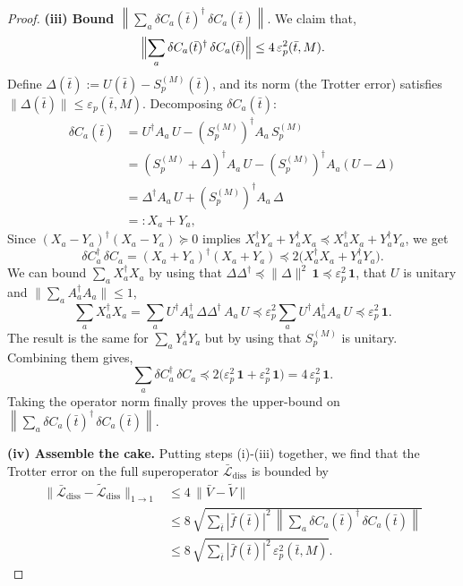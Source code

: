 \begin{proof}
    \medskip
    \noindent\textbf{(iii) Bound $\left\|\sum_a \delta C_a(\bar{t})^\dagger\, \delta C_a(\bar{t})\right\|$}. We claim that,
    $$
    \Bigl\|\sum_a \delta C_a(\bar{t})^\dagger\, \delta C_a(\bar{t})\Bigr\| \leq 4\,\varepsilon_p^2(\bar{t}, M).
    $$
    Define $\Delta(\bar{t}) := U(\bar{t}) - S_p^{(M)}(\bar{t})$, and its norm (the Trotter error) satisfies $\|\Delta(\bar{t})\| \leq \varepsilon_p(\bar{t}, M)$. Decomposing $\delta C_a(\bar{t})$:
    $$
    \begin{aligned}
        \delta C_a(\bar{t}) &= U^\dagger A_a\, U - (S_p^{(M)})^\dagger A_a\, S_p^{(M)} \\
    &= (S_p^{(M)} + \Delta)^\dagger A_a\, U - (S_p^{(M)})^\dagger A_a (U - \Delta) \\
    &= \Delta^\dagger A_a\, U + (S_p^{(M)})^\dagger A_a\, \Delta \\
    &=: X_a + Y_a,
    \end{aligned}
    $$
    Since $(X_a - Y_a)^\dagger(X_a - Y_a) \succeq 0$ implies $X_a^\dagger Y_a + Y_a^\dagger X_a \preceq X_a^\dagger X_a + Y_a^\dagger Y_a$, we get
    $$
    \delta C_a^\dagger\, \delta C_a = (X_a + Y_a)^\dagger(X_a + Y_a) \preceq 2\bigl(X_a^\dagger X_a + Y_a^\dagger Y_a\bigr).
    $$
    We can bound $\sum_a X_a^\dagger X_a$ by using that $\Delta\Delta^\dagger \preceq \|\Delta\|^2\, \mathbf{1} \preceq \varepsilon_p^2\, \mathbf{1}$, that $U$ is unitary and $\|\sum_a A_a^\dagger A_a\| \leq 1$,
    $$
    \sum_a X_a^\dagger X_a = \sum_a U^\dagger A_a^\dagger\, \Delta\Delta^\dagger\, A_a\, U
    \preceq \varepsilon_p^2 \sum_a U^\dagger A_a^\dagger A_a\, U
    \preceq \varepsilon_p^2\, \mathbf{1}.
    $$
    The result is the same for $\sum_a Y_a^\dagger Y_a$ but by using that $S_p^{(M)}$ is unitary.
    Combining them gives, 
    $$
    \sum_a \delta C_a^\dagger\, \delta C_a \preceq 2\bigl(\varepsilon_p^2\, \mathbf{1} + \varepsilon_p^2\, \mathbf{1}\bigr) = 4\,\varepsilon_p^2\, \mathbf{1}.
    $$
    Taking the operator norm finally proves the upper-bound on $\left\|\sum_a \delta C_a(\bar{t})^\dagger\, \delta C_a(\bar{t})\right\|$.

    \medskip
    \noindent\textbf{(iv) Assemble the cake.} Putting steps (i)-(iii) together, we find that the Trotter error on the full superoperator $\mathcal{\bar{L}}_\text{diss}$ is bounded by
    \begin{align*}
        \bigl\|\bar{\mathcal{L}}_{\mathrm{diss}} - \tilde{\mathcal{L}}_{\mathrm{diss}}\bigr\|_{1 \to 1}
    &\leq 4\,\|\bar{V} - \tilde{V}\| \tag{i}\\
    &\leq 8 \,\sqrt{\sum_{\bar{t}} |\bar{f}(\bar{t})|^2\, \left\|\sum_a \delta C_a(\bar{t})^\dagger\, \delta C_a(\bar{t})\right\|} \tag{ii}\\
    &\leq 8 \,\sqrt{\sum_{\bar{t}} |\bar{f}(\bar{t})|^2\, \varepsilon_p^2(\bar{t}, M)}. \tag{iii}
    \end{align*}


\end{proof}
